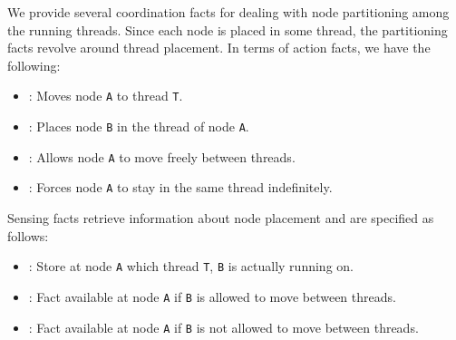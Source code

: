 
We provide several coordination facts for dealing with node partitioning among
the running threads. Since each node is placed in some thread, the partitioning
facts revolve around thread placement.  In terms of action facts, we have the
following:

\begin{itemize}
   \item {}: Moves node \texttt{A} to thread
   \texttt{T}.

   \item {}: Places node \texttt{B} in
   the thread of node \texttt{A}.

   \item {}: Allows node \texttt{A} to move freely
   between threads.

   \item {}: Forces node \texttt{A} to stay in the
   same thread indefinitely.

\end{itemize}

Sensing facts retrieve information about node placement and are specified as
follows:

\begin{itemize}

   \item {}: Store at node \texttt{A} which
   thread \texttt{T}, \texttt{B} is actually running on.

   \item {}: Fact available at node \texttt{A} if \texttt{B} is allowed
   to move between threads.

   \item {}: Fact available at node \texttt{A} if \texttt{B} is not
   allowed to move between threads.

\end{itemize}

